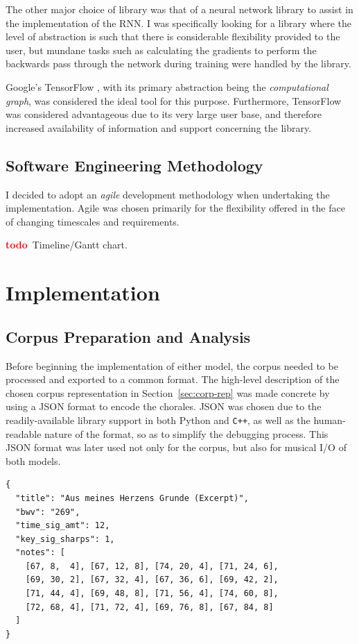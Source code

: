\documentclass[12pt,a4paper,twoside,openright]{report}
\newcommand{\todo}{\textcolor{red}{\textbf{todo}~}}
\begin{document}
The other major choice of library was that of a neural network library to assist
in the implementation of the RNN. I was specifically looking for a library where
the level of abstraction is such that there is considerable flexibility provided
to the user, but mundane tasks such as calculating the gradients to perform the
backwards pass through the network during training were handled by the library.

Google's TensorFlow \cite{abadi2016tensorflow}, with its primary abstraction
being the \emph{computational graph}, was considered the ideal tool for this
purpose.  Furthermore, TensorFlow was considered advantageous due to
its very large user base, and therefore increased availability of information
and support concerning the library.

\section{Software Engineering Methodology}

I decided to adopt an \emph{agile} development methodology when undertaking the
implementation. Agile was chosen primarily for the flexibility offered in the
face of changing timescales and requirements.

\todo Timeline/Gantt chart.

\chapter{Implementation}\label{chap:impl}

\section{Corpus Preparation and Analysis}\label{sec:corpus-prep-analysis}

Before beginning the implementation of either model, the corpus needed to be
processed and exported to a common format. The high-level description of the
chosen corpus representation in Section~\ref{sec:corp-rep} was made concrete by
using a JSON format to encode the chorales. JSON was chosen due to the
readily-available library support in both Python and \texttt{C++}, as well as
the human-readable nature of the format, so as to simplify the debugging
process. This JSON format was later used not only for the corpus, but also for
musical I/O of both models.

\vspace{4mm}
\begin{verbatim}
{
  "title": "Aus meines Herzens Grunde (Excerpt)",
  "bwv": "269",
  "time_sig_amt": 12,
  "key_sig_sharps": 1,
  "notes": [
    [67, 8,  4], [67, 12, 8], [74, 20, 4], [71, 24, 6], 
    [69, 30, 2], [67, 32, 4], [67, 36, 6], [69, 42, 2], 
    [71, 44, 4], [69, 48, 8], [71, 56, 4], [74, 60, 8], 
    [72, 68, 4], [71, 72, 4], [69, 76, 8], [67, 84, 8]
  ]
}
\end{verbatim}
\end{document}
